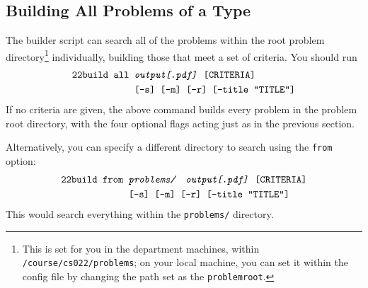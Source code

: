   \subsection{Building All Problems of a Type}
    The builder script can search all of the problems within the root problem directory\footnote{This is set for you in the department machines, within \texttt{/course/cs022/problems}; on your local machine, you can set it within the config file by changing the path set as the \texttt{problemroot}.} individually, building those that meet a set of criteria. You should run
    \begin{align*}\texttt{22build }\texttt{all }&\texttt{\textit{output[.pdf]} [CRITERIA]}\\~&\texttt{[-s] [-m] [-r] [--title ``TITLE'']}\end{align*}
    If no criteria are given, the above command builds every problem in the problem root directory, with the four optional flags acting just as in the previous section.
    
    Alternatively, you can specify a different directory to search using the \texttt{from} option:
    \begin{align*}\texttt{22build }\texttt{from }&\texttt{\textit{problems/\ \ output[.pdf]} [CRITERIA]}\\~&\texttt{[-s] [-m] [-r] [--title ``TITLE'']}\end{align*}
    This would search everything within the \texttt{problems/} directory.
    
